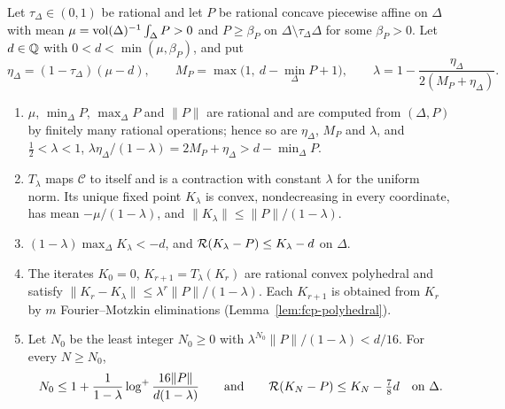 \begin{proposition}\label{prop:fcp-fixed-point}
Let $\tau_\Delta\in(0,1)$ be rational and let $P$ be rational concave piecewise affine on $\Delta$ with mean
$\mu=\operatorname{vol}(\Delta)^{-1}\int_\Delta P>0$ and $P\ge\beta_P$ on $\Delta\setminus\tau_\Delta\Delta$ for some $\beta_P>0$. Let
$d\in\mathbb{Q}$ with $0<d<\min(\mu,\beta_P)$, and put
\[
 \eta_\Delta=(1-\tau_\Delta)(\mu-d),\qquad M_P=\max\bigl(1,\ d-\min_\Delta P+1\bigr),\qquad
 \lambda=1-\frac{\eta_\Delta}{2(M_P+\eta_\Delta)} .
\]
\begin{enumerate}[label=(\alph*)]
\item $\mu$, $\min_\Delta P$, $\max_\Delta P$ and $\|P\|$ are rational and are computed from $(\Delta,P)$ by finitely
 many rational operations; hence so are $\eta_\Delta$, $M_P$ and $\lambda$, and $\tfrac12<\lambda<1$,
 $\lambda\eta_\Delta/(1-\lambda)=2M_P+\eta_\Delta>d-\min_\Delta P$.
\item $T_\lambda$ maps $\mathcal C$ to itself and is a contraction with constant $\lambda$ for the uniform norm. Its
 unique fixed point $K_\lambda$ is convex, nondecreasing in every coordinate, has mean $-\mu/(1-\lambda)$, and
 $\|K_\lambda\|\le\|P\|/(1-\lambda)$.
\item $(1-\lambda)\max_\Delta K_\lambda<-d$, and $\mathcal{R}(K_\lambda-P)\le K_\lambda-d$ on $\Delta$.
\item The iterates $K_0=0$, $K_{r+1}=T_\lambda(K_r)$ are rational convex polyhedral and satisfy
 $\|K_r-K_\lambda\|\le\lambda^r\|P\|/(1-\lambda)$. Each $K_{r+1}$ is obtained from $K_r$ by $m$ Fourier--Motzkin
 eliminations (Lemma~\ref{lem:fcp-polyhedral}).
\item Let $N_0$ be the least integer $N_0\ge0$ with $\lambda^{N_0}\|P\|/(1-\lambda)<d/16$. For every $N\ge N_0$,
 \[
  N_0\le1+\frac1{1-\lambda}\log^+\frac{16\|P\|}{d(1-\lambda)}\qquad\text{and}\qquad
  \mathcal{R}(K_N-P)\le K_N-\tfrac78d\quad\text{on }\Delta .
 \]
\end{enumerate}
\end{proposition}

